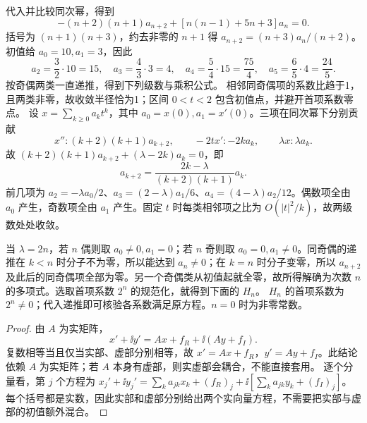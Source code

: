 代入并比较同次幂，得到
\[
-(n+2)(n+1)a_{n+2}+[n(n-1)+5n+3]a_n=0.
\]
括号为 $(n+1)(n+3)$，约去非零的 $n+1$ 得 $a_{n+2}=(n+3)a_n/(n+2)$。初值给 $a_0=10,a_1=3$，因此
\[
a_2=\dfrac32\cdot10=15,\quad a_3=\dfrac43\cdot3=4,
\quad a_4=\dfrac54\cdot15=\dfrac{75}{4},\quad a_5=\dfrac65\cdot4=\dfrac{24}{5}.
\]
按奇偶两类一直递推，得到下列级数与乘积公式。
相邻同奇偶项的系数比趋于1，且两类非零，故收敛半径恰为1；区间 $0<t<2$ 包含初值点，并避开首项系数零点。
设 $x=\sum_{k\ge0}a_kt^k$，其中 $a_0=x(0),a_1=x'(0)$。三项在同次幂下分别贡献
\[
x'':(k+2)(k+1)a_{k+2},\qquad -2tx':-2ka_k,
\qquad \lambda x:\lambda a_k.
\]
故 $(k+2)(k+1)a_{k+2}+(\lambda-2k)a_k=0$，即
\[
a_{k+2}=\dfrac{2k-\lambda}{(k+2)(k+1)}a_k.
\]
前几项为 $a_2=-\lambda a_0/2$、$a_3=(2-\lambda)a_1/6$、$a_4=(4-\lambda)a_2/12$。偶数项全由 $a_0$ 产生，奇数项全由 $a_1$ 产生。固定 $t$ 时每类相邻项之比为 $O(|t|^2/k)$，故两级数处处收敛。

当 $\lambda=2n$，若 $n$ 偶则取 $a_0\ne0,a_1=0$；若 $n$ 奇则取 $a_0=0,a_1\ne0$。同奇偶的递推在 $k<n$ 时分子不为零，所以能达到 $a_n\ne0$；在 $k=n$ 时分子变零，所以 $a_{n+2}$ 及此后的同奇偶项全部为零。另一个奇偶类从初值起就全零，故所得解确为次数 $n$ 的多项式。选取首项系数 $2^n$ 的规范化，就得到下面的 $H_n$。
$H_n$ 的首项系数为 $2^n\ne0$；代入递推即可核验各系数满足原方程。$n=0$ 时为非零常数。
\begin{proof}
由 $A$ 为实矩阵，
\[
 x'+\ii y'=Ax+f_R+\ii(Ay+f_I).
\]
复数相等当且仅当实部、虚部分别相等，故 $x'=Ax+f_R$，$y'=Ay+f_I$。此结论依赖 $A$ 为实矩阵；若 $A$ 本身有虚部，则实虚部会耦合，不能直接套用。
逐个分量看，第 $j$ 个方程为 $x_j'+\ii y_j'=\sum_k a_{jk}x_k+(f_R)_j+\ii[\sum_k a_{jk}y_k+(f_I)_j]$。每个括号都是实数，因此实部和虚部分别给出两个实向量方程，不需要把实部与虚部的初值额外混合。
\end{proof}
